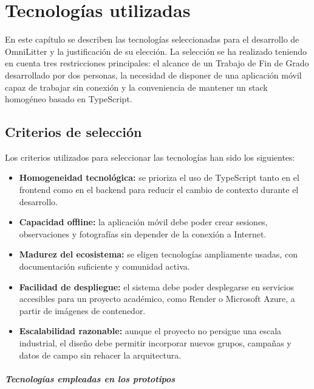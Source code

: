 
\chapter{Tecnologías utilizadas}

En este capítulo se describen las tecnologías seleccionadas para el desarrollo de
OmniLitter y la justificación de su elección. La selección se ha realizado teniendo
en cuenta tres restricciones principales: el alcance de un Trabajo de Fin de Grado
desarrollado por dos personas, la necesidad de disponer de una aplicación móvil
capaz de trabajar sin conexión y la conveniencia de mantener un stack homogéneo
basado en TypeScript.

\section{Criterios de selección}

Los criterios utilizados para seleccionar las tecnologías han sido los siguientes:

\begin{itemize}
  \item \textbf{Homogeneidad tecnológica:} se prioriza el uso de TypeScript tanto
    en el frontend como en el backend para reducir el cambio de contexto durante
    el desarrollo.
  \item \textbf{Capacidad offline:} la aplicación móvil debe poder crear sesiones,
    observaciones y fotografías sin depender de la conexión a Internet.
  \item \textbf{Madurez del ecosistema:} se eligen tecnologías ampliamente usadas,
    con documentación suficiente y comunidad activa.
  \item \textbf{Facilidad de despliegue:} el sistema debe poder desplegarse en
    servicios accesibles para un proyecto académico, como Render o Microsoft Azure,
    a partir de imágenes de contenedor.
  \item \textbf{Escalabilidad razonable:} aunque el proyecto no persigue una escala
    industrial, el diseño debe permitir incorporar nuevos grupos, campañas y datos
    de campo sin rehacer la arquitectura.
\end{itemize}

\paragraph{Tecnologías empleadas en los prototipos}


